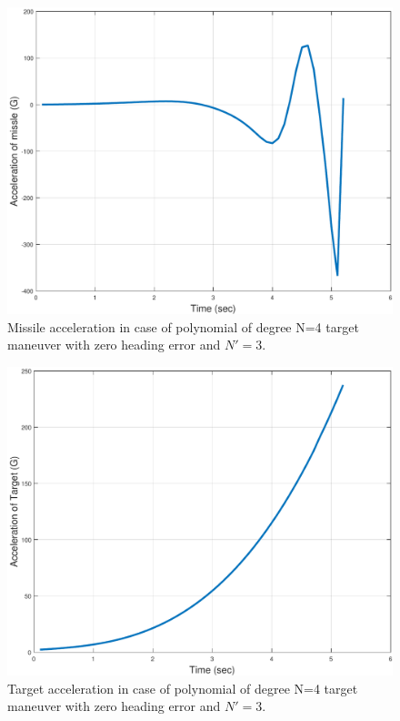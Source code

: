 \begin{figure}[htb]
	\centering
	\includegraphics[scale = 0.35]{fig/MissileAccelerationP4N3.pdf}
	\caption{Missile acceleration in case of  polynomial of degree N=4 target maneuver with zero heading error and $N'=3$.}
	\label{missile accelerationP4}
\end{figure}

\begin{figure}[H]
	\centering
	\includegraphics[scale = 0.35]{fig/TargetAccelerationP4N3.pdf}
	\caption{Target acceleration in case of  polynomial of degree N=4 target maneuver with zero heading error and $N'=3$.}
	\label{Target accelerationP4N3}
\end{figure}


